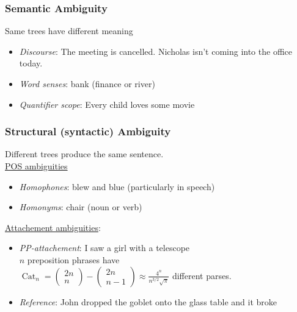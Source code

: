 \documentclass[8pt]{extarticle} %
\begin{document}
\begin{multicols*}{3}

\subsubsection*{Semantic Ambiguity}
Same trees have different meaning
\begin{itemize}[label=\textbullet, labelsep=0.3em, leftmargin=0.5em, itemsep=0em]
    \item \textit{Discourse}: The meeting is cancelled. Nicholas isn't coming into the office today.
    \item \textit{Word senses}: bank (finance or river)
    \item \textit{Quantifier scope}: Every child loves some movie
\end{itemize}

\subsubsection*{Structural (syntactic) Ambiguity}
Different trees produce the same sentence. \\

\underline{POS ambiguities}
\begin{itemize}[label=\textbullet, labelsep=0.3em, leftmargin=0.5em, itemsep=0em]
    \item \textit{Homophones}: blew and blue (particularly in speech)
    \item \textit{Homonyms}: chair (noun or verb)
\end{itemize}
\underline{Attachement ambiguities}:
\begin{itemize}[label=\textbullet, labelsep=0.3em, leftmargin=0.5em, itemsep=0em]
    \item \textit{PP-attachement}: I saw a girl with a telescope\\
$n$ preposition phrases have \\$\operatorname{Cat}_n = \left(\begin{array}{c}2 n \\ n\end{array}\right)-\left(\begin{array}{c}2 n \\ n-1\end{array}\right) \approx \frac{4^n}{n^{3 / 2} \sqrt{\pi}}$ different parses.\\
    \item \textit{Reference}: John dropped the goblet onto the glass table and it broke
\end{itemize}


\end{multicols*}
\end{document}
